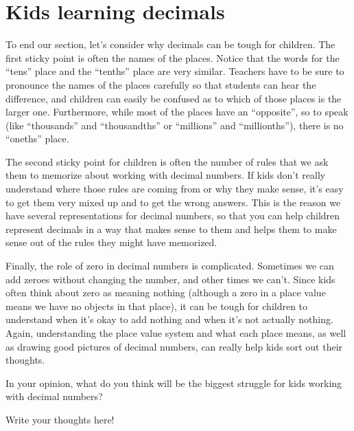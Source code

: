 \documentclass{ximera}
\begin{document}
\section{Kids learning decimals}

To end our section, let's consider why decimals can be tough for children. The first sticky point is often the names of the places. Notice that the words for the ``tens'' place and the ``tenths'' place are very similar. Teachers have to be sure to pronounce the names of the places carefully so that students can hear the difference, and children can easily be confused as to which of those places is the larger one. Furthermore, while most of the places have an ``opposite'', so to speak (like ``thousands'' and ``thousandths'' or ``millions'' and ``millionths''), there is no ``oneths'' place. 

The second sticky point for children is often the number of rules that we ask them to memorize about working with decimal numbers. If kids don't really understand where those rules are coming from or why they make sense, it's easy to get them very mixed up and to get the wrong answers. This is the reason we have several representations for decimal numbers, so that you can help children represent decimals in a way that makes sense to them and helps them to make sense out of the rules they might have memorized.

Finally, the role of zero in decimal numbers is complicated. Sometimes we can add zeroes without changing the number, and other times we can't. Since kids often think about zero as meaning nothing (although a zero in a place value means we have no objects in that place), it can be tough for children to understand when it's okay to add nothing and when it's not actually nothing. Again, understanding the place value system and what each place means, as well as drawing good pictures of decimal numbers, can really help kids sort out their thoughts.

\begin{question}
In your opinion, what do you think will be the biggest struggle for kids working with decimal numbers?
\begin{freeResponse}
Write your thoughts here!
\end{freeResponse}
\end{question}
\end{document}
